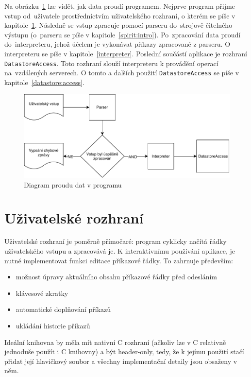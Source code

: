 \documentclass[thesis=B,czech,hidelinks]{FITthesis}[2019/03/06]
\newcommand{\Rplus}{\protect\hspace{-.1em}\protect\raisebox{.35ex}{\smaller{\smaller\textbf{+}}}}
\newcommand{\Cpp}{\mbox{C\Rplus\Rplus}\xspace}
\begin{document}
Na obrázku~\ref{proud:dat} lze vidět, jak data proudí programem. Nejprve program přijme vstup od~uživatele prostředníctvím uživatelského rozhraní, o kterém se píše v kapitole~\ref{ui}. Následně se vstup zpracuje pomocí parseru do~strojově čitelného výstupu (o~parseru se píše v kapitole~\ref{spirit:intro}). Po~zpracování data proudí do~interpreteru, jehož účelem je vykonávat příkazy zpracované z parseru. O interpreteru se píše v kapitole~\ref{interpreter}. Poslední součástí aplikace je rozhraní \texttt{DatastoreAccess}. Toto rozhraní slouží interpreteru k provádění operací na~vzdálených serverech. O tomto a dalších použití \texttt{DatastoreAccess} se píše v kapitole~\ref{datastore:access}.
\begin{figure}
\begin{center}
\includegraphics[width=.9\textwidth]{diagram}
\end{center}
\caption{Diagram proudu dat v programu}\label{proud:dat}
\end{figure}


\section{Uživatelské rozhraní}\label{ui}
Uživatelské rozhraní je poměrně přímočaré: program cyklicky načítá řádky uživatelského vstupu a zpracovává je. K interaktivnímu používání aplikace, je nutné implementovat funkci editace příkazové řádky. To zahrnuje především:
\begin{itemize}
    \item možnost úpravy aktuálního obsahu příkazové řádky před odesláním
    \item klávesové zkratky
    \item automatické doplňování příkazů
    \item ukládání historie příkazů
\end{itemize}
Ideální knihovna by měla mít nativní \Cpp{} rozhraní (ačkoliv lze v \Cpp{} relativně jednoduše použít i C knihovny) a být header-only, tedy, že k jejímu použití stačí přidat její hlavičkový soubor a všechny implementační detaily jsou obsaženy v něm.
\end{document}
